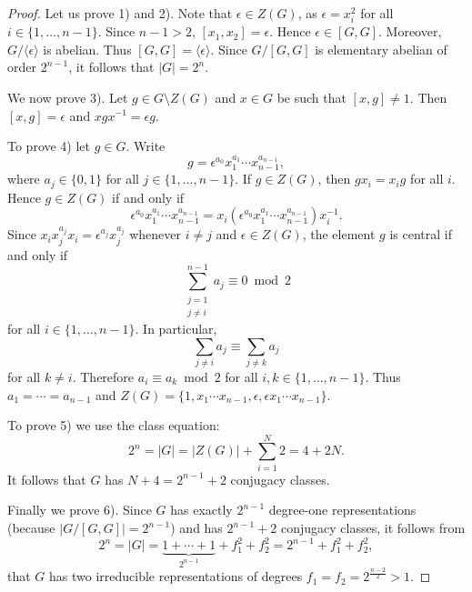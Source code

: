  \begin{proof}
     Let us prove 1) and 2). Note that $\epsilon\in Z(G)$, as
     $\epsilon=x_i^2$ for all 
 	$i\in\{1,\dots,n-1\}$. Since $n-1>2$, $[x_1,x_2]=\epsilon$. Hence 
 	$\epsilon\in [G,G]$. Moreover, $G/\langle\epsilon\rangle$ is abelian. Thus 
 	$[G,G]=\langle \epsilon\rangle$. Since $G/[G,G]$ is elementary 
 	abelian of order 
 	$2^{n-1}$, it follows that 
 	$|G|=2^n$. 

 	We now prove 3). Let $g\in G\setminus Z(G)$ and 
 	$x\in G$ be such that $[x,g]\ne 1$. Then $[x,g]=\epsilon$ and 
 	$xgx^{-1}=\epsilon g$. 

 	To prove 4) let $g\in G$. Write
 	\[
 		g=\epsilon^{a_0}x_1^{a_1}\cdots x_{n-1}^{a_{n-1}},
 	\]
 	where $a_j\in\{0,1\}$ for all $j\in\{1,\dots,n-1\}$. 
 	If $g\in Z(G)$, then $gx_i=x_ig$ for all $i$. Hence 
 	$g\in Z(G)$ if and only if 
 	\[
 		\epsilon^{a_0}x_1^{a_1}\cdots x_{n-1}^{a_{n-1}}=x_i(\epsilon^{a_0}x_1^{a_1}\cdots x_{n-1}^{a_{n-1}})x_i^{-1}.
 	\]
 	Since $x_ix_j^{a_j}x_i=\epsilon^{a_j}x_j^{a_j}$ 
 	whenever $i\ne j$ and $\epsilon\in Z(G)$, the element $g$ is 
 	central if and only if 
 	\[
 		\sum_{\substack{j=1\\j\ne i}}^{n-1}a_j\equiv 0\bmod 2
 	\]
 	for all $i\in\{1,\dots,n-1\}$. In particular, 
 	\[
 	\sum_{j\ne i}a_j\equiv \sum_{j\ne k}a_j
 	\]
 	for all $k\ne i$. Therefore $a_i\equiv a_k\bmod 2$ for all 
 	$i,k\in\{1,\dots,n-1\}$. Thus $a_1=\cdots=a_{n-1}$ and  
 	$Z(G)=\{1,x_1\cdots x_{n-1},\epsilon,\epsilon x_1\cdots
 	x_{n-1}\}$. 
	
     To prove 5) we use the class equation:
     \[
 		2^n=|G|=|Z(G)|+\sum_{i=1}^N2=4+2N. 
 	\]
 	It follows that $G$ has $N+4=2^{n-1}+2$ conjugacy classes.
	
 	Finally we prove 6). 
 	Since $G$ 
 	has exactly $2^{n-1}$ degree-one representations (because 
 	$|G/[G,G]|=2^{n-1}$) and 
 	has $2^{n-1}+2$ conjugacy classes, 
 	it follows from 
 	\[
 		2^n=|G|=\underbrace{1+\cdots+1}_{2^{n-1}}+f_1^2+f_2^2=2^{n-1}+f_1^2+f_2^2,
 	\]
 	that $G$ has two irreducible representations
 	of degrees $f_1=f_2=2^{\frac{n-2}{2}}>1$. 
 \end{proof}

